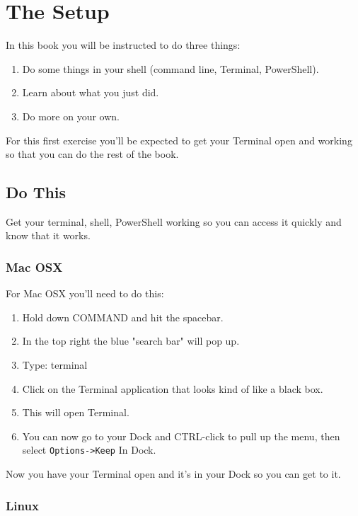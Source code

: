 \chapter{The Setup}

In this book you will be instructed to do three things:

\begin{enumerate}
\item Do some things in your shell (command line, Terminal, PowerShell).
\item Learn about what you just did.
\item Do more on your own.
\end{enumerate}

For this first exercise you'll be expected to get your Terminal open and working so that you can do
the rest of the book.

\section{Do This}

Get your terminal, shell, PowerShell working so you can access it quickly and know that it works.

\subsection{Mac OSX}

For Mac OSX you'll need to do this:

\begin{enumerate}
\item Hold down COMMAND and hit the spacebar.
\item In the top right the blue "search bar" will pop up.
\item Type:  terminal
\item Click on the Terminal application that looks kind of like a black box.
\item This will open Terminal.
\item You can now go to your Dock and CTRL-click to pull up the menu, then select \verb|Options->Keep| In Dock.
\end{enumerate}

Now you have your Terminal open and it's in your Dock so you can get to it.

\subsection{Linux}

